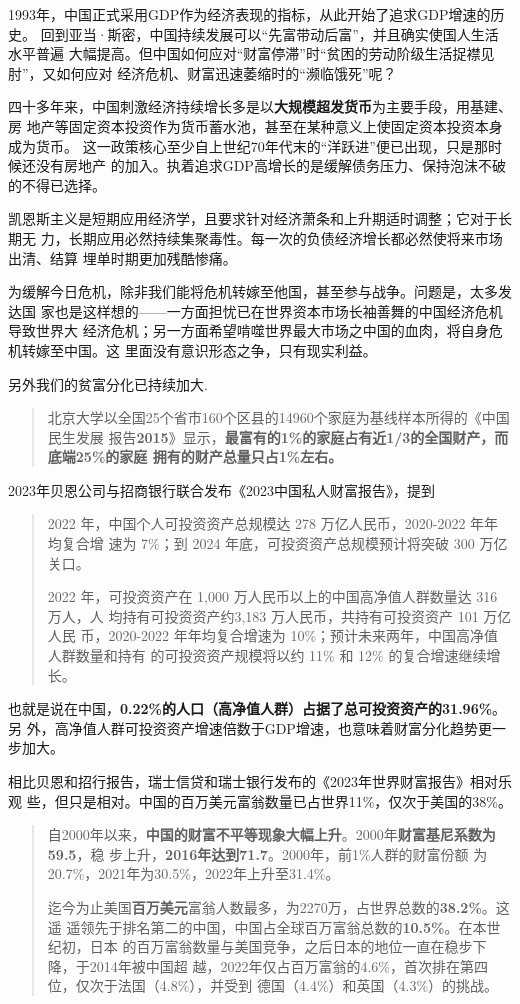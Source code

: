 1993年，中国正式采用GDP作为经济表现的指标，从此开始了追求GDP增速的历史。
回到亚当·斯密，中国持续发展可以“先富带动后富”，并且确实使国人生活水平普遍
大幅提高。但中国如何应对“财富停滞”时“贫困的劳动阶级生活捉襟见肘”，又如何应对
经济危机、财富迅速萎缩时的“濒临饿死”呢？

四十多年来，中国刺激经济持续增长多是以\textbf{大规模超发货币}为主要手段，用基建、房
地产等固定资本投资作为货币蓄水池，甚至在某种意义上使固定资本投资本身成为货币。
这一政策核心至少自上世纪70年代末的“洋跃进”便已出现，只是那时候还没有房地产
的加入。执着追求GDP高增长的是缓解债务压力、保持泡沫不破的不得已选择。

凯恩斯主义是短期应用经济学，且要求针对经济萧条和上升期适时调整；它对于长期无
力，长期应用必然持续集聚毒性。每一次的负债经济增长都必然使将来市场出清、结算
埋单时期更加残酷惨痛。

为缓解今日危机，除非我们能将危机转嫁至他国，甚至参与战争。问题是，太多发达国
家也是这样想的——一方面担忧已在世界资本市场长袖善舞的中国经济危机导致世界大
经济危机；另一方面希望啃噬世界最大市场之中国的血肉，将自身危机转嫁至中国。这
里面没有意识形态之争，只有现实利益。

另外我们的贫富分化已持续加大.
\begin{quotation}
  北京大学以全国25个省市160个区县的14960个家庭为基线样本所得的《中国民生发展
  报告\textbf{2015}》显示，\textbf{最富有的1\%的家庭占有近1/3的全国财产，而底端25\%的家庭
    拥有的财产总量只占1\%左右。}\cite{dajueqi}
\end{quotation}

2023年贝恩公司与招商银行联合发布《2023中国私人财富报告》，提到
\begin{quotation}
  2022 年，中国个人可投资资产总规模达 278 万亿人民币，2020-2022 年年均复合增
  速为 7\%；到 2024 年底，可投资资产总规模预计将突破 300 万亿关口。

  2022 年，可投资资产在 1,000 万人民币以上的中国高净值人群数量达 316 万人，人
  均持有可投资资产约3,183 万人民币，共持有可投资资产 101 万亿人民
  币，2020-2022 年年均复合增速为 10\%；预计未来两年，中国高净值人群数量和持有
  的可投资资产规模将以约 11\% 和 12\% 的复合增速继续增长。
\end{quotation}
也就是说在中国，\textbf{0.22\%的人口（高净值人群）占据了总可投资资产的31.96\%}。另
外，高净值人群可投资资产增速倍数于GDP增速，也意味着财富分化趋势更一步加大。

相比贝恩和招行报告，瑞士信贷和瑞士银行发布的《2023年世界财富报告》相对乐观
些，但只是相对。中国的百万美元富翁数量已占世界11\%，仅次于美国的38\%。
\begin{quotation}
  自2000年以来，\textbf{中国的财富不平等现象大幅上升}。2000年\textbf{财富基尼系数为59.5}，稳
  步上升，\textbf{2016年达到71.7}。2000年，前1\%人群的财富份额
  为20.7\%，2021年为30.5\%，2022年上升至31.4\%。

  迄今为止美国\textbf{百万美元}富翁人数最多，为2270万，占世界总数的\textbf{38.2\%}。这遥
  遥领先于排名第二的中国，中国占全球百万富翁总数的\textbf{10.5\%}。在本世纪初，日本
  的百万富翁数量与美国竞争，之后日本的地位一直在稳步下降，于2014年被中国超
  越，2022年仅占百万富翁的4.6\%，首次排在第四位，仅次于法国（4.8\%），并受到
  德国（4.4\%）和英国（4.3\%）的挑战。
\end{quotation}


